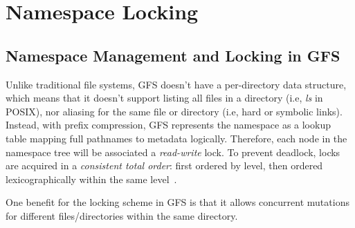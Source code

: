 
%
%


\chapter{Namespace Locking}
\label{ch:Locking}

%

\section{Namespace Management and Locking in GFS}

Unlike traditional file systems, GFS doesn't have a per-directory data structure, which means that it doesn't support listing all files in a directory (i.e, \textit{ls} in POSIX), nor aliasing for the same file or directory (i.e, hard or symbolic links). Instead, with prefix compression, GFS represents the namespace as a lookup table mapping full pathnames to metadata logically. Therefore, each node in the namespace tree will be associated a \textit{read-write} lock. To prevent deadlock, locks are acquired in a \textit{consistent total order}: first ordered by level, then ordered lexicographically within the same level~\cite{ghemawat2003google}.

\noindent One benefit for the locking scheme in GFS is that it allows concurrent mutations for different files/directories within the same directory. 


